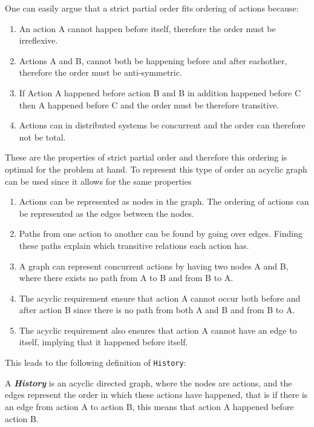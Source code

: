 	\newpar One can easily argue that a strict partial order fits ordering of actions because:
	\begin{enumerate}
		\item An action A cannot happen before itself, therefore the order must be irreflexive.
		\item Actions A and B, cannot both be happening before and after eachother, therefore the order must be anti-symmetric.
		\item If Action A happened before action B and B in addition happened before C then A happened before C and the order must be therefore transitive.
		\item Actions can in distributed systems be concurrent and the order can therefore not be total.
	\end{enumerate}
	\newpar These are the properties of strict partial order and therefore this ordering is optimal for the problem at hand. To represent this type of order an acyclic graph can be used since it allows for the same properties
	\begin{enumerate}
		\item Actions can be represented as nodes in the graph. The ordering of actions can be represented as the edges between the nodes.
		\item Paths from one action to another can be found by going over edges. Finding these paths explain which transitive relations each action has.
		\item A graph can represent concurrent actions by having two nodes A and B, where there exists no path from A to B and from B to A.
		\item The acyclic requirement ensure that action A cannot occur both before and after action B since there is no path from both A and B and from B to A.
		\item The acyclic requirement also ensures that action A cannot have an edge to itself, implying that it happened before itself.
	\end{enumerate}
	
	\newpar This leads to the following definition of \texttt{History}:
	
	\begin{definition}
		A \textit{\textbf{History}} is an acyclic directed graph, where the nodes are actions, and the edges represent the order in which these actions have happened, that is if there is an edge from action A to action B, this means that action A happened before action B.
	\end{definition}
	
